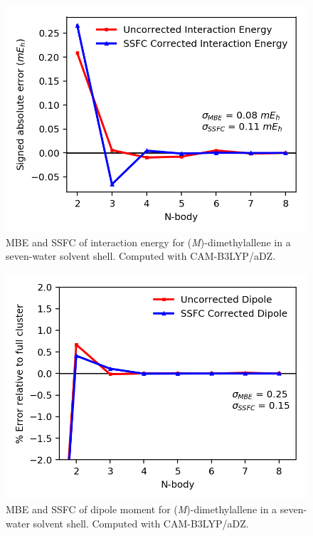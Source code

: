     \begin{figure}
        \centering
        \includegraphics[scale=0.75]{p1/graphs/si/dma_7_cam_int.png}
        \caption{MBE and SSFC of interaction energy for (\textit{M})-dimethylallene in a seven-water solvent shell. Computed with CAM-B3LYP/aDZ.}
        \label{dma_7_cam_int}
    \end{figure}
    \begin{figure}
        \centering
        \includegraphics[scale=0.75]{p1/graphs/si/dma_7_cam_dip.png}
        \caption{MBE and SSFC of dipole moment for (\textit{M})-dimethylallene in a seven-water solvent shell. Computed with CAM-B3LYP/aDZ.}
        \label{dma_7_cam_dip}
    \end{figure}

